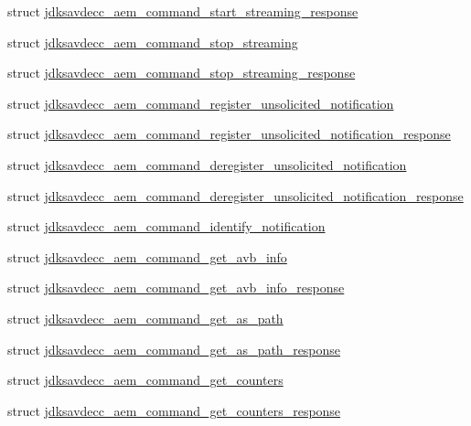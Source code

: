 \begin{DoxyCompactItemize}
struct \hyperlink{structjdksavdecc__aem__command__start__streaming__response}{jdksavdecc\+\_\+aem\+\_\+command\+\_\+start\+\_\+streaming\+\_\+response}
\item 
struct \hyperlink{structjdksavdecc__aem__command__stop__streaming}{jdksavdecc\+\_\+aem\+\_\+command\+\_\+stop\+\_\+streaming}
\item 
struct \hyperlink{structjdksavdecc__aem__command__stop__streaming__response}{jdksavdecc\+\_\+aem\+\_\+command\+\_\+stop\+\_\+streaming\+\_\+response}
\item 
struct \hyperlink{structjdksavdecc__aem__command__register__unsolicited__notification}{jdksavdecc\+\_\+aem\+\_\+command\+\_\+register\+\_\+unsolicited\+\_\+notification}
\item 
struct \hyperlink{structjdksavdecc__aem__command__register__unsolicited__notification__response}{jdksavdecc\+\_\+aem\+\_\+command\+\_\+register\+\_\+unsolicited\+\_\+notification\+\_\+response}
\item 
struct \hyperlink{structjdksavdecc__aem__command__deregister__unsolicited__notification}{jdksavdecc\+\_\+aem\+\_\+command\+\_\+deregister\+\_\+unsolicited\+\_\+notification}
\item 
struct \hyperlink{structjdksavdecc__aem__command__deregister__unsolicited__notification__response}{jdksavdecc\+\_\+aem\+\_\+command\+\_\+deregister\+\_\+unsolicited\+\_\+notification\+\_\+response}
\item 
struct \hyperlink{structjdksavdecc__aem__command__identify__notification}{jdksavdecc\+\_\+aem\+\_\+command\+\_\+identify\+\_\+notification}
\item 
struct \hyperlink{structjdksavdecc__aem__command__get__avb__info}{jdksavdecc\+\_\+aem\+\_\+command\+\_\+get\+\_\+avb\+\_\+info}
\item 
struct \hyperlink{structjdksavdecc__aem__command__get__avb__info__response}{jdksavdecc\+\_\+aem\+\_\+command\+\_\+get\+\_\+avb\+\_\+info\+\_\+response}
\item 
struct \hyperlink{structjdksavdecc__aem__command__get__as__path}{jdksavdecc\+\_\+aem\+\_\+command\+\_\+get\+\_\+as\+\_\+path}
\item 
struct \hyperlink{structjdksavdecc__aem__command__get__as__path__response}{jdksavdecc\+\_\+aem\+\_\+command\+\_\+get\+\_\+as\+\_\+path\+\_\+response}
\item 
struct \hyperlink{structjdksavdecc__aem__command__get__counters}{jdksavdecc\+\_\+aem\+\_\+command\+\_\+get\+\_\+counters}
\item 
struct \hyperlink{structjdksavdecc__aem__command__get__counters__response}{jdksavdecc\+\_\+aem\+\_\+command\+\_\+get\+\_\+counters\+\_\+response}

\end{DoxyCompactItemize}

